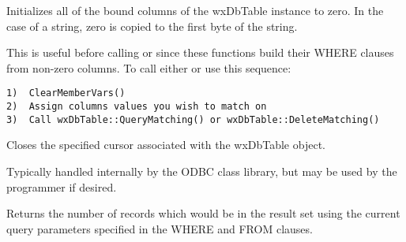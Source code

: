\label{wxdbtableclearmembervars}


Initializes all of the bound columns of the wxDbTable instance to zero.  
In the case of a string, zero is copied to the first byte of the string.  


This is useful before calling  or 
 since these 
functions build their WHERE clauses from non-zero columns.  To call either 
 or 
 use this sequence:

\begin{verbatim}
1)  ClearMemberVars()
2)  Assign columns values you wish to match on
3)  Call wxDbTable::QueryMatching() or wxDbTable::DeleteMatching()
\end{verbatim}

\label{wxdbtableclosecursor}


Closes the specified cursor associated with the wxDbTable object.




Typically handled internally by the ODBC class library, but may be used by the 
programmer if desired.


\label{wxdbtablecount}


Returns the number of records which would be in the result set using the
current query parameters specified in the WHERE and FROM clauses.



